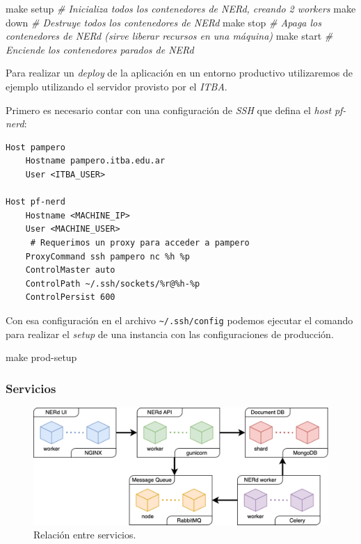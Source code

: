 \documentclass[12pt,a4paper,]{scrartcl}
\newenvironment{Shaded}{\begin{snugshade}}{\end{snugshade}}
\newcommand{\CommentTok}[1]{\textcolor[rgb]{0.56,0.35,0.01}{\textit{#1}}}
\newcommand{\FunctionTok}[1]{\textcolor[rgb]{0.00,0.00,0.00}{#1}}
\newcommand{\NormalTok}[1]{#1}
\begin{document}
\begin{Shaded}
\begin{Highlighting}[]
\FunctionTok{make}\NormalTok{ setup }\CommentTok{# Inicializa todos los contenedores de NERd, creando 2 workers}
\FunctionTok{make}\NormalTok{ down }\CommentTok{# Destruye todos los contenedores de NERd}
\FunctionTok{make}\NormalTok{ stop }\CommentTok{# Apaga los contenedores de NERd (sirve liberar recursos en una máquina)}
\FunctionTok{make}\NormalTok{ start }\CommentTok{# Enciende los contenedores parados de NERd}
\end{Highlighting}
\end{Shaded}

Para realizar un \emph{deploy} de la aplicación en un entorno productivo utilizaremos de ejemplo utilizando el servidor provisto por el \emph{ITBA}.

Primero es necesario contar con una configuración de \emph{SSH} que defina el \emph{host} \emph{pf-nerd}:

\begin{verbatim}
Host pampero
    Hostname pampero.itba.edu.ar
    User <ITBA_USER>

Host pf-nerd
    Hostname <MACHINE_IP>
    User <MACHINE_USER>
     # Requerimos un proxy para acceder a pampero
    ProxyCommand ssh pampero nc %h %p
    ControlMaster auto
    ControlPath ~/.ssh/sockets/%r@%h-%p
    ControlPersist 600
\end{verbatim}

Con esa configuración en el archivo \texttt{\textasciitilde{}/.ssh/config} podemos ejecutar el comando para realizar el \emph{setup} de una instancia con las configuraciones de producción.

\begin{Shaded}
\begin{Highlighting}[]
\FunctionTok{make}\NormalTok{ prod-setup}
\end{Highlighting}
\end{Shaded}

\hypertarget{servicios}{%
\subsubsection{Servicios}\label{servicios}}

\begin{figure}[H]

{\centering \includegraphics{assets/physical/overview.pdf} 

}

\caption{Relación entre servicios.}\label{fig:deployment-physical-overview}
\end{figure}
\end{document}
